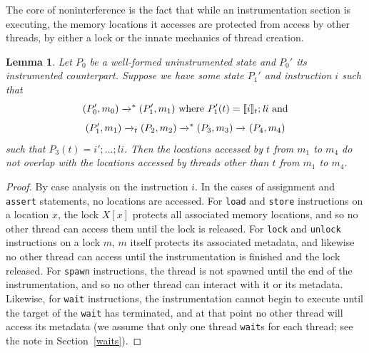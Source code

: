 \documentclass[preprint, 10pt]{sigplanconf}
\newcommand{\meanl}{\ensuremath{[ \! [}}
\newcommand{\meanr}{\ensuremath{] \! ]}}
\newcommand{\means}[1]{\ensuremath{\meanl #1 \meanr}}
\newcommand{\instr}[2]{\ensuremath{\means{#2}_{#1}}}
\newcommand{\cfg}[2]{\ensuremath{(#1, #2)}}
\newcommand{\anarrow}[2]{\ensuremath{\xrightarrow{#2}_{#1}}}
\newcommand{\exec}[5]{\ensuremath{\cfg{#1}{#2} \anarrow{#3}{#4} #5}}
\newcommand{\execstar}[4]{\ensuremath{\cfg{#1}{#2} \tto{#3} #4}}
\newcommand{\execs}[3]{\ensuremath{ \xrightarrow{#2}_{#1} #3}}
\newcommand{\execstars}[2]{\ensuremath{ \tto{#1} #2}}
\newcommand{\tto}[1]{\mathrel{
  \vphantom{\xrightarrow{#1}}
  \smash{\xrightarrow{#1}}
  \vphantom{\to}^{*}}
}
\newtheorem{lemma}{Lemma}
\begin{document}
The core of noninterference is the fact that while an instrumentation section is executing, the memory locations it accesses are protected from access by other threads, by either a lock or the innate mechanics of thread creation.
\begin{lemma}\label{indep}Let $P_0$ be a well-formed uninstrumented state and $P_0'$ its instrumented counterpart. Suppose we have some state $P_1'$ and instruction $i$ such that \[\execstar{P_0'}{m_0}{}{(P_1', m_1)}\ \mathrm{where}\ P_1'(t) = \instr{t}{i}; \mathit{li} \ \mathrm{and}\] \[\exec{P_1'}{m_1}{t}{}{(P_2, m_2)} \execstars{}{(P_3, m_3)} \execs{}{}{(P_4, m_4)}\] such that $P_3(t) = i'; ...; \mathit{li}$. Then the locations accessed by $t$ from $m_1$ to $m_4$ do not overlap with the locations accessed by threads other than $t$ from $m_1$ to $m_4$.\end{lemma}
\begin{proof}By case analysis on the instruction $i$. In the cases of assignment and \texttt{assert} statements, no locations are accessed. For \texttt{load} and \texttt{store} instructions on a location $x$, the lock $X[x]$ protects all associated memory locations, and so no other thread can access them until the lock is released. For \texttt{lock} and \texttt{unlock} instructions on a lock $m$, $m$ itself protects its associated metadata, and likewise no other thread can access until the instrumentation is finished and the lock released. For \texttt{spawn} instructions, the thread is not spawned until the end of the instrumentation, and so no other thread can interact with it or its metadata. Likewise, for \texttt{wait} instructions, the instrumentation cannot begin to execute until the target of the \texttt{wait} has terminated, and at that point no other thread will access its metadata (we assume that only one thread \texttt{wait}s for each thread; see the note in Section~\ref{waits}).\end{proof}
\end{document}
